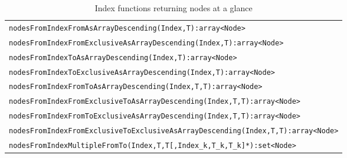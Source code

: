 \begin{table}[htbp]
\begin{tabular}{|l|}
\texttt{nodesFromIndexFromAsArrayDescending(Index,T):array<Node>}\\
\texttt{nodesFromIndexFromExclusiveAsArrayDescending(Index,T):array<Node>}\\
\texttt{nodesFromIndexToAsArrayDescending(Index,T):array<Node>}\\
\texttt{nodesFromIndexToExclusiveAsArrayDescending(Index,T):array<Node>}\\
\texttt{nodesFromIndexFromToAsArrayDescending(Index,T,T):array<Node>}\\
\texttt{nodesFromIndexFromExclusiveToAsArrayDescending(Index,T,T):array<Node>}\\
\texttt{nodesFromIndexFromToExclusiveAsArrayDescending(Index,T,T):array<Node>}\\
\texttt{nodesFromIndexFromExclusiveToExclusiveAsArrayDescending(Index,T,T):array<Node>}\\
\hline
\texttt{nodesFromIndexMultipleFromTo(Index,T,T[,Index\_k,T\_k,T\_k]*):set<Node>}\\
\hline
\end{tabular}
\caption{Index functions returning nodes at a glance}
\label{indexreturningnodestab}
\end{table}

\pagebreak

